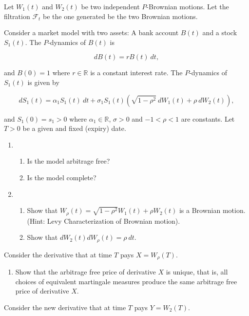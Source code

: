 \documentclass[a4paper,12pt,openany]{book}
\providecommand{\tightlist}{%
 \setlength{\itemsep}{0pt}\setlength{\parskip}{0pt}}
\begin{document}
Let \(W_1(t)\) and \(W_2(t)\) be two independent \(P\)-Brownian motions. Let the filtration \(\mathcal{F}_t\) be the one generated be the two Brownian motions.

Consider a market model with two assets: A bank account \(B(t)\) and a stock \(S_1(t)\). The \(P\)-dynamics of \(B(t)\) is

\[
dB(t)=rB(t)\ dt,
\]

and \(B(0)=1\) where \(r\in\mathbb{R}\) is a constant interest rate. The \(P\)-dynamics of \(S_1(t)\) is given by

\[
dS_1(t)=\alpha_1S_1(t)\ dt + \sigma_1 S_1(t)\left(\sqrt{1-\rho^2}\ dW_1(t)+\rho\ dW_2(t)\right),
\]

and \(S_1(0)=s_1>0\) where \(\alpha_1\in\mathbb{R}\), \(\sigma >0\) and \(-1<\rho<1\) are constants. Let \(T>0\) be a given and fixed (expiry) date.

\begin{enumerate}
\def\labelenumi{\alph{enumi}.}
\item
  \begin{enumerate}
  \def\labelenumii{\roman{enumii}.}
  \tightlist
  \item
    Is the model arbitrage free?
  \item
    Is the model complete?
  \end{enumerate}
\item
  \begin{enumerate}
  \def\labelenumii{\roman{enumii}.}
  \tightlist
  \item
    Show that \(W_\rho(t)=\sqrt{1-\rho^2}W_1(t)+\rho W_2(t)\) is a Brownian motion. (Hint: Levy Characterization of Brownian motion).
  \item
    Show that \(dW_2(t)d W_\rho(t)=\rho\ dt\).
  \end{enumerate}
\end{enumerate}

Consider the derivative that at time \(T\) pays \(X=W_\rho(T)\).

\begin{enumerate}
\def\labelenumi{\alph{enumi}.}
\setcounter{enumi}{2}
\tightlist
\item
  Show that the arbitrage free price of derivative \(X\) is unique, that is, all choices of equivalent martingale measures produce the same arbitrage free price of derivative \(X\).
\end{enumerate}

Consider the new derivative that at time \(T\) pays \(Y=W_2(T)\).
\end{document}
